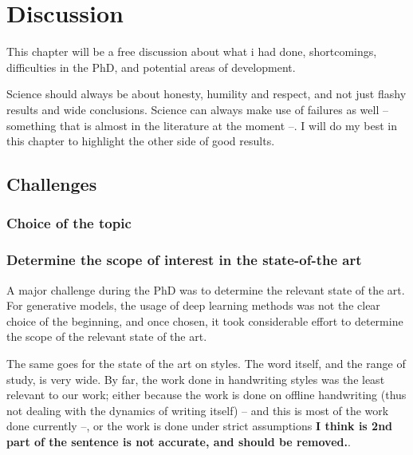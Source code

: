\chapter{Discussion}

This chapter will be a free discussion about what i had done, shortcomings, difficulties in the PhD, and potential areas of development.

Science should always be about honesty, humility and respect, and not just flashy results and wide conclusions. Science can always make use of failures as well -- something that is almost in the literature at the moment --. I will do my best in this chapter to highlight the other side of good results.

\section{Challenges}
\subsection{Choice of the topic}

\subsection{Determine the scope of interest in the state-of-the art}

\par A major challenge during the PhD was to determine the relevant state of the art. For generative models, the usage of deep learning methods was not the clear choice of the beginning, and once chosen, it took considerable effort to determine the scope of the relevant state of the art.

\par The same goes for the state of the art on styles. The word itself, and the range of study, is very wide. By far, the work done in handwriting styles was the least relevant to our work; either because the work is done on offline handwriting (thus not dealing with the dynamics of writing itself) -- and this is most of the work done currently --, or the work is done under strict assumptions \textbf{I think is 2nd part of the sentence is not accurate, and should be removed.}.

